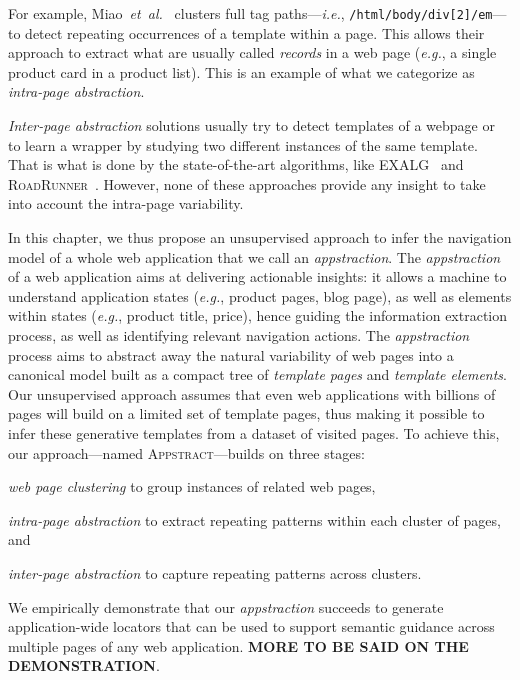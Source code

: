 For example, Miao~\textit{et~al.}~\cite{MiaoExtractingClustering} clusters full tag paths---\emph{i.e.}, \texttt{/html/body/div[2]/em}---to detect repeating occurrences of a template within a page.
This allows their approach to extract what are usually called \emph{records} in a web page (\emph{e.g.}, a single product card in a product list).
This is an example of what we categorize as \emph{intra-page abstraction}.

\emph{Inter-page abstraction} solutions usually try to detect templates of a webpage or to learn a wrapper by studying two different instances of the same template.
That is what is done by the state-of-the-art algorithms, like EXALG~\cite{ArasuExtractingPages} and \textsc{RoadRunner}~\cite{Crescenzi2001RoadRunner:Sites}.
However, none of these approaches provide any insight to take into account the intra-page variability.

In this chapter, we thus propose an unsupervised approach to infer the navigation model of a whole web application that we call an \textit{appstraction}.
The \textit{appstraction} of a web application aims at delivering actionable insights: it allows a machine to understand application states (\emph{e.g.}, product pages, blog page), as well as elements within states (\emph{e.g.}, product title, price), hence guiding the information extraction process, as well as identifying relevant navigation actions.
The \textit{appstraction} process aims to abstract away the natural variability of web pages into a canonical model built as a compact tree of \emph{template pages} and \emph{template elements}.
Our unsupervised approach assumes that even web applications with billions of pages will build on a limited set of template pages, thus making it possible to infer these generative templates from a dataset of visited pages.
To achieve this, our approach---named \textsc{Appstract}---builds on three stages:
\begin{inparaenum}
    \item \textit{web page clustering} to group instances of related web pages,
    \item \textit{intra-page abstraction} to extract repeating patterns within each cluster of pages, and
    \item \textit{inter-page abstraction} to capture repeating patterns across clusters.
\end{inparaenum}

We empirically demonstrate that our \emph{appstraction} succeeds to generate application-wide locators that can be used to support semantic guidance across multiple pages of any web application.
\textbf{MORE TO BE SAID ON THE DEMONSTRATION}.

